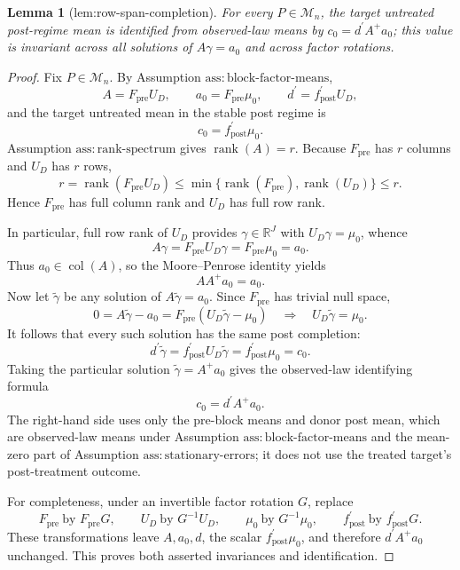 \documentclass{article}
\newtheorem{lemma}{Lemma}
\begin{document}
\begin{lemma}[lem:row-span-completion]\label{lem:row-span-completion}
For every \(P\in\mathcal M_n\), the target untreated post-regime mean is identified from observed-law means by \(c_0=d^{\prime}A^+a_0\); this value is invariant across all solutions of \(A\gamma=a_0\) and across factor rotations.
\end{lemma}
\begin{proof}
Fix \(P\in\mathcal M_n\).  By Assumption \(\mathrm{ass:block\mbox{-}factor\mbox{-}means}\),
\[
A=F_{\mathrm{pre}}U_D,\qquad
a_0=F_{\mathrm{pre}}\mu_0,\qquad
d^{\prime}=f_{\mathrm{post}}^{\prime}U_D,
\]
and the target untreated mean in the stable post regime is
\[
c_0=f_{\mathrm{post}}^{\prime}\mu_0.
\]
Assumption \(\mathrm{ass:rank\mbox{-}spectrum}\) gives \(\operatorname{rank}(A)=r\).  Because \(F_{\mathrm{pre}}\) has \(r\) columns and \(U_D\) has \(r\) rows,
\[
r=\operatorname{rank}(F_{\mathrm{pre}}U_D)
\leq\min\{\operatorname{rank}(F_{\mathrm{pre}}),
\operatorname{rank}(U_D)\}
\leq r.
\]
Hence \(F_{\mathrm{pre}}\) has full column rank and \(U_D\) has full row rank.

In particular, full row rank of \(U_D\) provides \(\gamma\in\mathbb R^J\) with \(U_D\gamma=\mu_0\), whence
\[
A\gamma=F_{\mathrm{pre}}U_D\gamma
=F_{\mathrm{pre}}\mu_0=a_0.
\]
Thus \(a_0\in\operatorname{col}(A)\), so the Moore--Penrose identity yields
\[
AA^+a_0=a_0.
\]
Now let \(\widetilde\gamma\) be any solution of \(A\widetilde\gamma=a_0\).  Since \(F_{\mathrm{pre}}\) has trivial null space,
\[
0=A\widetilde\gamma-a_0
=F_{\mathrm{pre}}(U_D\widetilde\gamma-\mu_0)
\quad\Longrightarrow\quad
U_D\widetilde\gamma=\mu_0.
\]
It follows that every such solution has the same post completion:
\[
d^{\prime}\widetilde\gamma
=f_{\mathrm{post}}^{\prime}U_D\widetilde\gamma
=f_{\mathrm{post}}^{\prime}\mu_0=c_0.
\]
Taking the particular solution \(\widetilde\gamma=A^+a_0\) gives the observed-law identifying formula
\[
c_0=d^{\prime}A^+a_0.
\]
The right-hand side uses only the pre-block means and donor post mean, which are observed-law means under Assumption \(\mathrm{ass:block\mbox{-}factor\mbox{-}means}\) and the mean-zero part of Assumption \(\mathrm{ass:stationary\mbox{-}errors}\); it does not use the treated target's post-treatment outcome.

For completeness, under an invertible factor rotation \(G\), replace
\[
F_{\mathrm{pre}}\ \text{by }F_{\mathrm{pre}}G,\qquad
U_D\ \text{by }G^{-1}U_D,\qquad
\mu_0\ \text{by }G^{-1}\mu_0,\qquad
f_{\mathrm{post}}^{\prime}\ \text{by }f_{\mathrm{post}}^{\prime}G.
\]
These transformations leave \(A,a_0,d\), the scalar \(f_{\mathrm{post}}^{\prime}\mu_0\), and therefore \(d^{\prime}A^+a_0\) unchanged.  This proves both asserted invariances and identification.
\end{proof}
\end{document}
